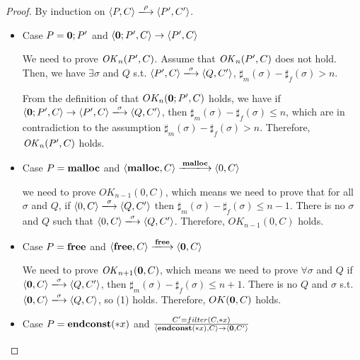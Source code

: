 \begin{proof}
By induction on \(\langle P, C \rangle \xlongrightarrow{\rho} \langle P', C' \rangle \).

\begin{itemize}

\item Case \(P = {\bf 0};P'\) and \( \langle {\bf 0};P', C \rangle \rightarrow \langle P', C \rangle\)

  We need to prove \(\mathit{OK}_n(P', C)\).  Assume that \(\mathit{OK}_n(P', C)\)
  does not hold. Then, we have \( \exists \sigma \) and \(Q\) s.t. \(
  \langle P', C \rangle \xlongrightarrow{\sigma} \langle Q, C' \rangle
  \), \(\sharp_{m}(\sigma) - \sharp_{f}(\sigma) > n\).

  From the definition of that \(OK_n({\bf 0};P', C)\) holds, we have
  if \( \langle {\bf 0};P', C \rangle \rightarrow \langle P', C
  \rangle \xlongrightarrow{\sigma} \langle Q, C' \rangle \), then
  \(\sharp_m(\sigma) - \sharp_f(\sigma) \le n \), which are in
  contradiction to the assumption \(\sharp_{m}(\sigma) -
  \sharp_{f}(\sigma) > n\). Therefore, \(\mathit{OK}_n(P', C)\) holds.

\item Case \(P = \mathbf{malloc}\) and \( \langle \Malloc, C \rangle \xlongrightarrow{\Malloc} \langle
          0, C \rangle\)

  we need to prove \(OK_{n-1}(0, C)\), which means we need to prove
  that for all \(\sigma\) and \(Q\), if \(\langle 0, C \rangle
  \xlongrightarrow{\sigma} \langle Q, C'\rangle\) then
  \(\sharp_{m}(\sigma) - \sharp_{f}(\sigma) \le n - 1\). There is no
  \(\sigma\) and \(Q\) such that \(\langle 0, C \rangle
  \xlongrightarrow{\sigma} \langle Q, C'\rangle\). Therefore,
  \(OK_{n-1}(0, C)\) holds.

\item Case \(P = \mathbf{free}\) and \(\langle \Free, C \rangle
  \xlongrightarrow{\Free} \langle {\bf 0}, C \rangle \)

  We need to prove \(\mathit{OK}_{n+1}({\bf 0}, C)\), which means we need to
  prove \( \forall \sigma \) and \(Q\) if \( \langle {\bf 0}, C
  \rangle \xlongrightarrow{\sigma} \langle Q, C' \rangle \), then
  \(\sharp_{m}(\sigma) - \sharp_{f}(\sigma) \le n + 1\).  There is no
  \(Q\) and \(\sigma\) s.t. \(\langle {\bf 0}, C \rangle
  \xlongrightarrow{\sigma} \langle Q, C \rangle \), so (1)
  holds. Therefore, \(OK({\bf 0}, C)\) holds.

\item Case \(P = \mathbf{endconst}(*x)\) and \(\frac {C' = filter(C, *x) }
  {\langle \mathbf{endconst}(*x), C \rangle \rightarrow \langle {\bf 0}, C' \rangle} \)


\end{itemize}
\end{proof}
